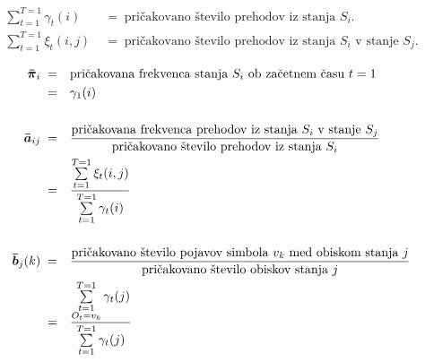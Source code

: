 \begin{align*}
\sum\limits_{t=1}^{T=1} \gamma_t(i)\;&=\;\text{pričakovano število prehodov iz stanja $S_i$.} \\
\sum\limits_{t=1}^{T=1} \xi_t(i, j)\;&=\;\text{pričakovano število prehodov iz stanja $S_i$ v stanje $S_j$.}
\end{align*}

\begin{align}
\boldsymbol{\bar{\pi}}_i\;=&\quad\text{pričakovana frekvenca stanja $S_i$ ob začetnem času $t=1$} \nonumber \\
=&\quad\gamma_1(i)
\label{eq:hmm:reest:pi}
\\[\baselineskip]
\boldsymbol{\bar{a}}_{ij}\;=&\quad\frac{
\text{pričakovana frekvenca prehodov iz stanja $S_i$ v stanje $S_j$}
}{
\text{pričakovano število prehodov iz stanja $S_i$}
} \nonumber \\
=&\quad\frac{
\sum\limits_{t=1}^{T=1} \xi_t(i, j)
}{
\sum\limits_{t=1}^{T=1} \gamma_t(i)
}
\label{eq:hmm:reest:a}
\\[\baselineskip]
\boldsymbol{\bar{b}}_j(k)\;=&\quad\frac{
\text{pričakovano število pojavov simbola $v_k$ med obiskom stanja $j$}
}{
\text{pričakovano število obiskov stanja $j$}
} \nonumber \\
=&\quad\frac{
\sum\limits_{\substack{t=1 \\ O_t = v_k}}^{T=1} \gamma_t(j)
}{
\sum\limits_{t=1}^{T=1} \gamma_t(j)
}
\label{eq:hmm:reest:b}
\end{align}
